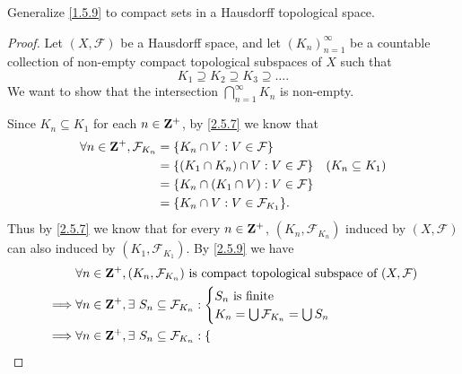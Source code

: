 \begin{exercise}\label{ex 2.5.13}
  Generalize \cref{1.5.9} to compact sets in a Hausdorff topological space.
\end{exercise}

\begin{proof}
  Let \((X, \mathcal{F})\) be a Hausdorff space, and let \((K_n)_{n = 1}^\infty\) be a countable collection of non-empty compact topological subspaces of \(X\) such that
  \[
    K_1 \supseteq K_2 \supseteq K_3 \supseteq \dots.
  \]
  We want to show that the intersection \(\bigcap_{n = 1}^\infty K_n\) is non-empty.

  Since \(K_n \subseteq K_1\) for each \(n \in \mathbf{Z}^+\), by \cref{2.5.7} we know that
  \begin{align*}
    \forall n \in \mathbf{Z}^+, \mathcal{F}_{K_n} & = \{K_n \cap V : V \in \mathcal{F}\}                                  \\
                                          & = \{(K_1 \cap K_n) \cap V : V \in \mathcal{F}\} & (K_n \subseteq K_1) \\
                                          & = \{K_n \cap (K_1 \cap V) : V \in \mathcal{F}\}                       \\
                                          & = \{K_n \cap V : V \in \mathcal{F}_{K_1}\}.
  \end{align*}
  Thus by \cref{2.5.7} we know that for every \(n \in \mathbf{Z}^+\), \((K_n, \mathcal{F}_{K_n})\) induced by \((X, \mathcal{F})\) can also induced by \((K_1, \mathcal{F}_{K_1})\).
  By \cref{2.5.9} we have
  \begin{align*}
             & \forall n \in \mathbf{Z}^+, (K_n, \mathcal{F}_{K_n}) \text{ is compact topological subspace of } (X, \mathcal{F})                                                                \\
    \implies & \forall n \in \mathbf{Z}^+, \exists\ S_n \subseteq \mathcal{F}_{K_n} : \begin{cases}
                                                                                S_n \text{ is finite} \\
                                                                                K_n = \bigcup \mathcal{F}_{K_n} = \bigcup S_n
                                                                              \end{cases}                                                              \\
    \implies & \forall n \in \mathbf{Z}^+, \exists\ S_n \subseteq \mathcal{F}_{K_n} : \begin{cases}

\end{cases}
\end{align*}
\end{proof}
